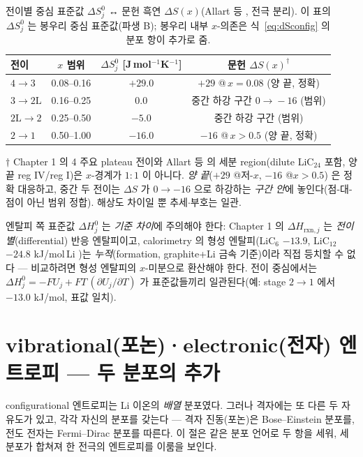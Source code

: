 \documentclass[11pt,a4paper]{article}
\newcommand{\rxn}{\mathrm{rxn}}
\begin{document}
\begin{table}[t]
\centering\small
\renewcommand{\arraystretch}{1.2}
\caption{전이별 중심 표준값 $\Delta S^0_j$ ↔ 문헌 흑연 $\Delta S(x)$(Allart 등 \cite{allart2018}, 전극 분리). 이 표의 $\Delta S^0_j$ 는 봉우리 중심 표준값(파생 B); 봉우리 내부 $x$-의존은 식~\eqref{eq:dSconfig} 의 분포 항이 추가로 줌.}
\label{tab:ds}
\begin{tabular}{l c c c}
\toprule
전이 & $x$ 범위 & $\Delta S^0_j$ [J\,mol$^{-1}$K$^{-1}$] & 문헌 $\Delta S(x)^\dagger$ \\
\midrule
$4\!\to\!3$ & 0.08–0.16 & $+29.0$ & $+29$ @\,$x{=}0.08$ (양 끝, 정확) \\
$3\!\to\!2\mathrm L$ & 0.16–0.25 & $0.0$ & 중간 하강 구간 $0\!\to\!-16$ (범위) \\
$2\mathrm L\!\to\!2$ & 0.25–0.50 & $-5.0$ & 중간 하강 구간 (범위) \\
$2\!\to\!1$ & 0.50–1.00 & $-16.0$ & $-16$ @\,$x{>}0.5$ (양 끝, 정확) \\
\bottomrule
\end{tabular}

\smallskip
{\footnotesize $\dagger$ Chapter 1 의 4 주요 plateau 전이와 Allart 등 \cite{allart2018} 의 세분 region(dilute
LiC$_{24}$ 포함, 양 끝 reg IV/reg I)은 $x$-경계가 $1{:}1$ 이 아니다. \emph{양 끝}($+29$ @저-$x$, $-16$ @$x{>}0.5$)
은 정확 대응하고, 중간 두 전이는 $\Delta S$ 가 $0\to-16$ 으로 하강하는 \emph{구간 안}에 놓인다(점-대-점이 아닌
범위 정합). 해상도 차이일 뿐 추세$\cdot$부호는 일관.}
\end{table}

엔탈피 쪽 표준값 $\Delta H^0_j$ 는 \emph{기준 차이}에 주의해야
한다: Chapter 1 의 $\Delta H_{\rxn,j}$ 는 \emph{전이별}(differential) 반응 엔탈피이고, calorimetry 의 형성
엔탈피(LiC$_6$ $-13.9$, LiC$_{12}$ $-24.8$ kJ/mol\,Li \cite{chemmater2015})는 \emph{누적}(formation,
graphite+Li 금속 기준)이라 직접 등치할 수 없다 — 비교하려면 형성 엔탈피의 $x$-미분으로 환산해야 한다. 전이
중심에서는 $\Delta H^0_j=-FU_j+FT\,(\partial U_j/\partial T)$ 가 표준값들끼리 일관된다(예: stage $2\to1$ 에서
$-13.0$ kJ/mol, 표값 일치).

\section{vibrational(포논)·electronic(전자) 엔트로피 — 두 분포의 추가}\label{sec:vibel}
configurational 엔트로피는 Li 이온의 \emph{배열} 분포였다. 그러나 격자에는 또 다른 두 자유도가 있고, 각각
자신의 분포를 갖는다 — 격자 진동(포논)은 Bose--Einstein 분포를, 전도 전자는 Fermi--Dirac 분포를 따른다.
이 절은 같은 분포 언어로 두 항을 세워, 세 분포가 합쳐져 한 전극의 엔트로피를 이룸을 보인다.
\end{document}
